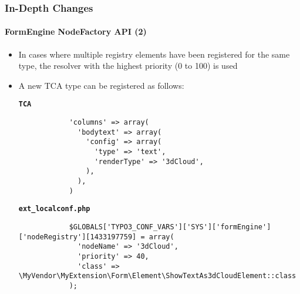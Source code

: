 \begin{frame}[fragile]
	\frametitle{In-Depth Changes}
	\framesubtitle{FormEngine NodeFactory API (2)}

	\lstset{basicstyle=\tiny\ttfamily}

	\begin{itemize}

		\item In cases where multiple registry elements have been registered for the same
			type, the resolver with the highest priority (0 to 100) is used

		\item A new TCA type can be registered as follows:

		\smaller\textbf{\texttt{TCA}}
		\begin{lstlisting}
			'columns' => array(
			  'bodytext' => array(
			    'config' => array(
			      'type' => 'text',
			      'renderType' => '3dCloud',
			    ),
			  ),
			)
		\end{lstlisting}

		\smaller\textbf{\texttt{ext\_localconf.php}}
		\begin{lstlisting}
			$GLOBALS['TYPO3_CONF_VARS']['SYS']['formEngine']['nodeRegistry'][1433197759] = array(
			  'nodeName' => '3dCloud',
			  'priority' => 40,
			  'class' => \MyVendor\MyExtension\Form\Element\ShowTextAs3dCloudElement::class
			);
		\end{lstlisting}

	\end{itemize}

\end{frame}


